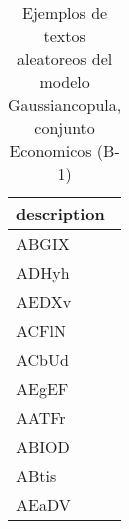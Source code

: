 \begin{table}[H]
\centering
\fontsize{8}{14}\selectfont
\caption{Ejemplos de textos aleatoreos del modelo Gaussiancopula, conjunto Economicos (B-1)}
\label{table-sample10-economicos-b-1-gaussiancopula-text}
\begin{tabular}{|m{50em}|}
\hline
\rowcolor[gray]{0.8}
description \\
\hline ABGIX \\
\hline ADHyh \\
\hline AEDXv \\
\hline ACFlN \\
\hline ACbUd \\
\hline AEgEF \\
\hline AATFr \\
\hline ABIOD \\
\hline ABtis \\
\hline AEaDV \\
\hline
\end{tabular}
\end{table}
